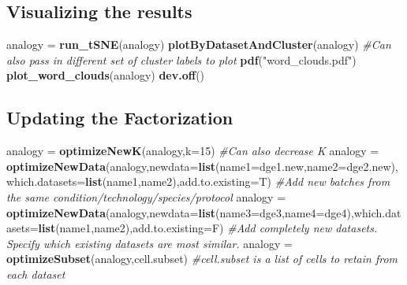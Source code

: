 \documentclass[]{article}
\newenvironment{Shaded}{\begin{snugshade}}{\end{snugshade}}
\newcommand{\KeywordTok}[1]{\textcolor[rgb]{0.13,0.29,0.53}{\textbf{#1}}}
\newcommand{\DataTypeTok}[1]{\textcolor[rgb]{0.13,0.29,0.53}{#1}}
\newcommand{\DecValTok}[1]{\textcolor[rgb]{0.00,0.00,0.81}{#1}}
\newcommand{\StringTok}[1]{\textcolor[rgb]{0.31,0.60,0.02}{#1}}
\newcommand{\CommentTok}[1]{\textcolor[rgb]{0.56,0.35,0.01}{\textit{#1}}}
\newcommand{\NormalTok}[1]{#1}
\begin{document}
\subsection{Visualizing the results}\label{visualizing-the-results}

\begin{Shaded}
\begin{Highlighting}[]
\NormalTok{analogy =}\StringTok{ }\KeywordTok{run_tSNE}\NormalTok{(analogy)}
\KeywordTok{plotByDatasetAndCluster}\NormalTok{(analogy) }\CommentTok{#Can also pass in different set of cluster labels to plot}
\KeywordTok{pdf}\NormalTok{(}\StringTok{"word_clouds.pdf"}\NormalTok{)}
\KeywordTok{plot_word_clouds}\NormalTok{(analogy)}
\KeywordTok{dev.off}\NormalTok{()}
\end{Highlighting}
\end{Shaded}

\subsection{Updating the
Factorization}\label{updating-the-factorization}

\begin{Shaded}
\begin{Highlighting}[]
\NormalTok{analogy =}\StringTok{ }\KeywordTok{optimizeNewK}\NormalTok{(analogy,}\DataTypeTok{k=}\DecValTok{15}\NormalTok{) }\CommentTok{#Can also decrease K}
\NormalTok{analogy =}\StringTok{ }\KeywordTok{optimizeNewData}\NormalTok{(analogy,}\DataTypeTok{newdata=}\KeywordTok{list}\NormalTok{(}\DataTypeTok{name1=}\NormalTok{dge1.new,}\DataTypeTok{name2=}\NormalTok{dge2.new),}\DataTypeTok{which.datasets=}\KeywordTok{list}\NormalTok{(name1,name2),}\DataTypeTok{add.to.existing=}\NormalTok{T) }\CommentTok{#Add new batches from the same condition/technology/species/protocol}
\NormalTok{analogy =}\StringTok{ }\KeywordTok{optimizeNewData}\NormalTok{(analogy,}\DataTypeTok{newdata=}\KeywordTok{list}\NormalTok{(}\DataTypeTok{name3=}\NormalTok{dge3,}\DataTypeTok{name4=}\NormalTok{dge4),}\DataTypeTok{which.datasets=}\KeywordTok{list}\NormalTok{(name1,name2),}\DataTypeTok{add.to.existing=}\NormalTok{F) }\CommentTok{#Add completely new datasets. Specify which existing datasets are most similar.}
\NormalTok{analogy =}\StringTok{ }\KeywordTok{optimizeSubset}\NormalTok{(analogy,cell.subset) }\CommentTok{#cell.subset is a list of cells to retain from each dataset}
\end{Highlighting}
\end{Shaded}
\end{document}
